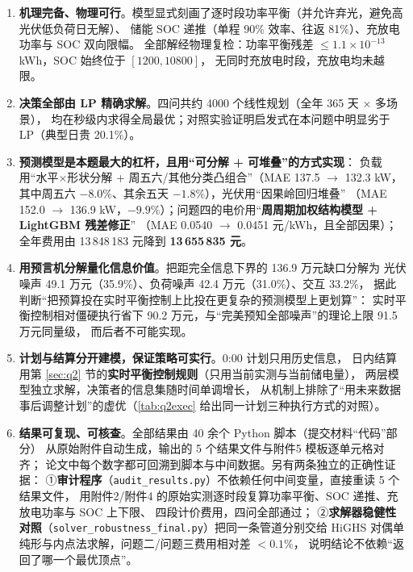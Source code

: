 \documentclass[12pt,a4paper,fontset=fandol]{ctexart}
\begin{document}
\begin{enumerate}[label=(\arabic*), leftmargin=2.2em, itemsep=2pt]
\item \textbf{机理完备\nobreak、物理可行}\nobreak。模型显式刻画了逐时段功率平衡（并允许弃光\nobreak，避免高光伏低负荷日无解\nobreak）\nobreak、
储能 SOC 递推（单程 90\% 效率\nobreak、往返 81\%\nobreak）\nobreak、充放电功率与 SOC 双向限幅\nobreak。
全部解经物理复检\nobreak：功率平衡残差 $\le1.1\times10^{-13}$ kWh\nobreak，SOC 始终位于 $[1200,10800]$\nobreak，
无同时充放电时段\nobreak，充放电均未越限\nobreak。
\item \textbf{决策全部由 LP 精确求解}\nobreak。四问共约 4000 个线性规划（全年 365 天 $\times$ 多场景\nobreak）\nobreak，
均在秒级内求得全局最优\nobreak；对照实验证明启发式在本问题中明显劣于 LP（典型日贵 20.1\%\nobreak）\nobreak。
\item \textbf{预测模型是本题最大的杠杆\nobreak，且用“可分解 + 可堆叠\nobreak”的方式实现}\nobreak：
负载用“水平$\times$形状分解 + 周五六/其他分类凸组合\nobreak”（MAE 137.5 $\to$ 132.3 kW\nobreak，
其中周五六 $-8.0\%$\nobreak、其余五天 $-1.8\%$\nobreak）\nobreak，光伏用“因果岭回归堆叠\nobreak”
（MAE 152.0 $\to$ 136.9 kW\nobreak，$-9.9\%$\nobreak）\nobreak；问题四的电价用“\textbf{周周期加权结构模型 + LightGBM 残差修正\nobreak}”
（MAE 0.0540 $\to$ 0.0451 元/kWh\nobreak，且全部因果\nobreak）\nobreak；全年费用由 13\,848\,183 元降到 \textbf{13\,655\,835 元}\nobreak。
\item \textbf{用预言机分解量化信息价值}\nobreak。把距完全信息下界的 136.9 万元缺口分解为
光伏噪声 49.1 万元（35.9\%\nobreak）\nobreak、负荷噪声 42.4 万元（31.0\%\nobreak）\nobreak、交互 33.2\%\nobreak，
据此判断“把预算投在实时平衡控制上比投在更复杂的预测模型上更划算\nobreak”\nobreak：
实时平衡控制相对僵硬执行省下 90.2 万元\nobreak，与“完美预知全部噪声\nobreak”的理论上限 91.5 万元同量级\nobreak，
而后者不可能实现\nobreak。
\item \textbf{计划与结算分开建模\nobreak，保证策略可实行}\nobreak。0:00 计划只用历史信息\nobreak，
日内结算用第 \ref{sec:q2} 节的\textbf{实时平衡控制规则}（只用当前实测与当前储电量\nobreak）\nobreak，
两层模型独立求解\nobreak，决策者的信息集随时间单调增长\nobreak，
从机制上排除了“用未来数据事后调整计划\nobreak”的虚优（\cref{tab:q2exec} 给出同一计划三种执行方式的对照\nobreak）\nobreak。
\item \textbf{结果可复现\nobreak、可核查}\nobreak。全部结果由 40 余个 Python 脚本（提交材料“代码\nobreak”部分\nobreak）
从原始附件自动生成\nobreak，输出的 5 个结果文件与附件5 模板逐单元格对齐\nobreak；
论文中每个数字都可回溯到脚本与中间数据\nobreak。另有两条独立的正确性证据\nobreak：
①\textbf{审计程序}（\texttt{audit\_results.py}\nobreak）不依赖任何中间变量\nobreak，直接重读 5 个结果文件\nobreak，
用附件2/附件4 的原始实测逐时段复算功率平衡\nobreak、SOC 递推\nobreak、充放电功率与 SOC 上下限\nobreak、
四段计价费用\nobreak，四问全部通过\nobreak；
②\textbf{求解器稳健性对照}（\texttt{solver\_robustness\_final.py}\nobreak）把同一条管道分别交给
HiGHS 对偶单纯形与内点法求解\nobreak，问题二/问题三费用相对差 $<0.1\%$\nobreak，
说明结论不依赖“返回了哪一个最优顶点\nobreak”\nobreak。
\end{enumerate}
\end{document}
